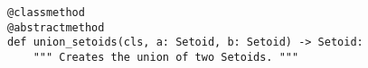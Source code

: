 \begin{verbatim}
@classmethod
@abstractmethod
def union_setoids(cls, a: Setoid, b: Setoid) -> Setoid:
    """ Creates the union of two Setoids. """
\end{verbatim}